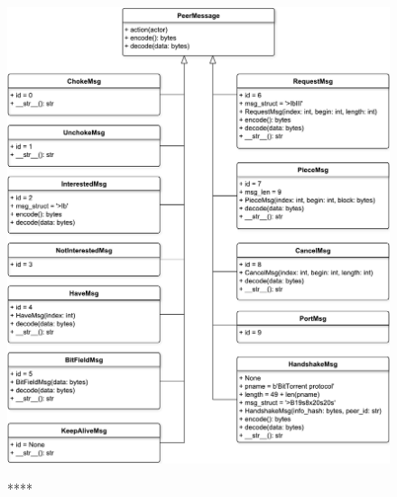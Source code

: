 \begin{figure}[h]
	\begin{center}
		{\includegraphics[scale = 0.57]{img/msgs.pdf}}
		\caption{****}
		\label{fig301:image}
	\end{center}
\end{figure}
